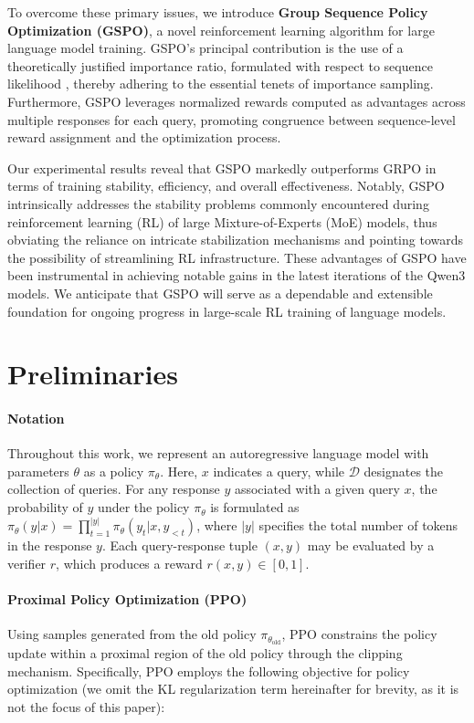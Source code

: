 To overcome these primary issues, we introduce \textbf{Group Sequence Policy Optimization (GSPO)}, a novel reinforcement learning algorithm for large language model training. GSPO's principal contribution is the use of a theoretically justified importance ratio, formulated with respect to sequence likelihood \citep{click}, thereby adhering to the essential tenets of importance sampling. Furthermore, GSPO leverages normalized rewards computed as advantages across multiple responses for each query, promoting congruence between sequence-level reward assignment and the optimization process.

Our experimental results reveal that GSPO markedly outperforms GRPO in terms of training stability, efficiency, and overall effectiveness. Notably, GSPO intrinsically addresses the stability problems commonly encountered during reinforcement learning (RL) of large Mixture-of-Experts (MoE) models, thus obviating the reliance on intricate stabilization mechanisms and pointing towards the possibility of streamlining RL infrastructure. These advantages of GSPO have been instrumental in achieving notable gains in the latest iterations of the Qwen3 models. We anticipate that GSPO will serve as a dependable and extensible foundation for ongoing progress in large-scale RL training of language models.

\section{Preliminaries}

\paragraph{Notation}
Throughout this work, we represent an autoregressive language model with parameters $\theta$ as a policy $\pi_\theta$. Here, $x$ indicates a query, while $\mathcal{D}$ designates the collection of queries. For any response $y$ associated with a given query $x$, the probability of $y$ under the policy $\pi_\theta$ is formulated as $\pi_\theta (y | x)=\prod_{t=1}^{|y|} \pi_\theta (y_t | x, y_{<t} )$, where $|y|$ specifies the total number of tokens in the response $y$. Each query-response tuple $(x, y)$ may be evaluated by a verifier $r$, which produces a reward $r(x, y) \in [0, 1]$.

\paragraph{Proximal Policy Optimization (PPO)} Using samples generated from the old policy $\pi_{\theta_\text{old}}$, PPO \citep{ppo} constrains the policy update within a proximal region of the old policy through the clipping mechanism. Specifically, PPO employs the following objective for policy optimization (we omit the KL regularization term hereinafter for brevity, as it is not the focus of this paper):

